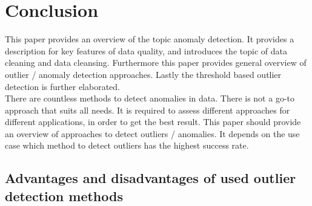 \chapter{Conclusion}
This paper provides an overview of the topic anomaly detection. It provides a description for key features of data quality, and introduces the topic of data cleaning and data cleansing. Furthermore this paper provides general overview of outlier / anomaly detection approaches. Lastly the threshold based outlier detection is further elaborated.\\
There are countless methods to detect anomalies in data. There is not a go-to approach that suits all needs. It is required to assess different approaches for different applications, in order to get the best result. This paper should provide an overview of approaches to detect outliers / anomalies. It depends on the use case which method to detect outliers has the highest success rate.  
\section{Advantages and disadvantages of used outlier detection methods}
